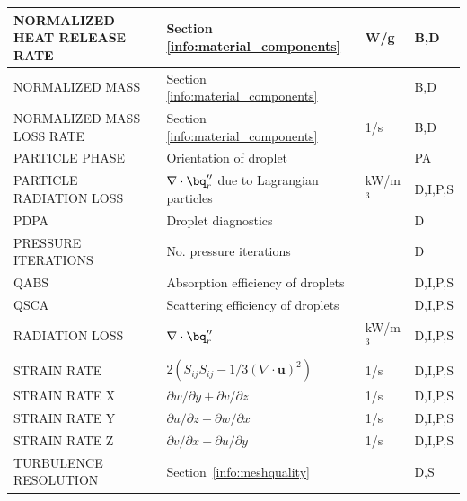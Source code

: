 \documentclass[11pt]{book}
\begin{document}
\begin{longtable}{@{\extracolsep{\fill}}|l|l|l|l|}
{\ct NORMALIZED HEAT RELEASE RATE}              & Section \ref{info:material_components}            & W/g            & B,D          \\ \hline
{\ct NORMALIZED MASS}                           & Section \ref{info:material_components}            &                & B,D          \\ \hline
{\ct NORMALIZED MASS LOSS RATE}                 & Section \ref{info:material_components}            & 1/s            & B,D          \\ \hline
{\ct PARTICLE PHASE}                            & Orientation of droplet                            &                & PA           \\ \hline
{\ct PARTICLE RADIATION LOSS}                   & $\nabla \cdot \bq_r''$ due to Lagrangian particles& kW/m$^3$       & D,I,P,S      \\ \hline
{\ct PDPA}                                      & Droplet diagnostics                               &                & D            \\ \hline
{\ct PRESSURE ITERATIONS}                       & No. pressure iterations                           &                & D            \\ \hline
{\ct QABS}                                      & Absorption efficiency of droplets                 &                & D,I,P,S      \\ \hline
{\ct QSCA}                                      & Scattering efficiency of droplets                 &                & D,I,P,S      \\ \hline
{\ct RADIATION LOSS}                            & $\nabla \cdot \bq_r''$                            & kW/m$^3$       & D,I,P,S      \\ \hline
{\ct STRAIN RATE}                               & $2(S_{ij}S_{ij}-1/3(\nabla\cdot\mathbf{u})^2)$    & 1/s            & D,I,P,S      \\ \hline
{\ct STRAIN RATE X}                             & $\partial w/\partial y + \partial v/\partial z$   & 1/s            & D,I,P,S      \\ \hline
{\ct STRAIN RATE Y}                             & $\partial u/\partial z + \partial w/\partial x$   & 1/s            & D,I,P,S      \\ \hline
{\ct STRAIN RATE Z}                             & $\partial v/\partial x + \partial u/\partial y$   & 1/s            & D,I,P,S      \\ \hline
{\ct TURBULENCE RESOLUTION}                     & Section~\ref{info:meshquality}                &                & D,S          \\ \hline

\end{longtable}
\end{document}
